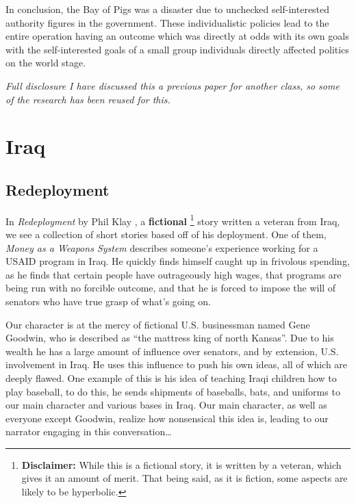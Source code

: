 \documentclass[12pt]{article}
\begin{document}
    In conclusion, the Bay of Pigs was a disaster due to unchecked self-interested authority figures in the government. These individualistic policies lead to the entire operation having an outcome which was directly at odds with its own goals with the self-interested goals of a small group individuals directly affected politics on the world stage.  

    \textit{Full disclosure I have discussed this a previous paper for another class, so some of the research has been reused for this.}

\section{Iraq}

    \subsection{Redeployment}
        In \textit{Redeployment} by Phil Klay \parencite{Klay2014}, a \textbf{fictional}
        \footnote{\textbf{Disclaimer:} While this is a fictional story, it is written by a veteran, which gives it an amount of merit. That being said, as it is fiction, some aspects are likely to be hyperbolic.} 
        story written a veteran from Iraq, we see a collection of short stories based off of his deployment. One of them, \textit{Money as a Weapons System} describes someone's experience working for a USAID program in Iraq. He quickly finds himself caught up in frivolous spending, as he finds that certain people have outrageously high wages, that programs are being run with no forcible outcome, and that he is forced to impose the will of senators who have true grasp of what's going on. 

        Our character is at the mercy of fictional U.S. businessman named Gene Goodwin, who is described as ``the mattress king of north Kansas''. Due to his wealth he has a large amount of influence over senators, and by extension, U.S. involvement in Iraq. He uses this influence to push his own ideas, all of which are deeply flawed. One example of this is his idea of teaching Iraqi children how to play baseball, to do this, he sends shipments of baseballs, bats, and uniforms to our main character and various bases in Iraq. Our main character, as well as everyone except Goodwin, realize how nonsensical this idea is, leading to our narrator engaging in this conversation\ldots
        
\end{document}
